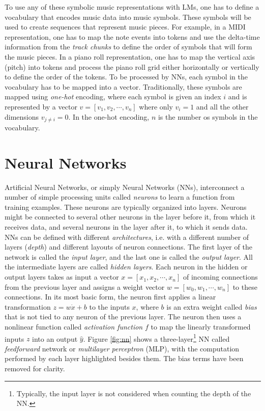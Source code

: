To use any of these symbolic music representations with LMs, one has to define a vocabulary that encodes music data into music symbols. These symbols will be used to create sequences that represent music pieces. For example, in a MIDI representation, one has to map the note events into tokens and use the delta-time information from the \textit{track chunks} to define the order of symbols that will form the music pieces. In a piano roll representation, one has to map the vertical axis (pitch) into tokens and process the piano roll grid either horizontally or vertically to define the order of the tokens. To be processed by NNs, each symbol in the vocabulary has to be mapped into a vector. Traditionally, these symbols are mapped using \textit{one-hot} encoding, where each symbol is given an index $i$ and is represented by a vector $v = [v_1, v_2, \cdots, v_n]$ where only $v_i = 1$ and all the other dimensions $v_{j \neq i} = 0$. In the one-hot encoding, $n$ is the number os symbols in the vocabulary.

\section{Neural Networks}

Artificial Neural Networks, or simply Neural Networks (NNs), interconnect a number of simple processing units called \textit{neurons} to learn a function from training examples. These neurons are typically organized into layers. Neurons might be connected to several other neurons in the layer before it, from which it receives data, and several neurons in the layer after it, to which it sends data. NNs can be defined with different \textit{architectures}, i.e. with a different number of layers (\textit{depth}) and different layouts of neuron connections. The first layer of the network is called the \textit{input layer}, and the last one is called the \textit{output layer}. All the intermediate layers are called \textit{hidden layers}. Each neuron in the hidden or output layers takes as input a vector $x = [x_1, x_2, \cdots, x_n]$ of incoming connections from the previous layer and assigns a weight vector $w = [w_0, w_1, \cdots, w_n]$ to these connections. In its most basic form, the neuron first applies a linear transformation $z = w \dot x + b$ to the inputs $x$, where $b$ is an extra weight called \textit{bias} that is not tied to any neuron of the previous layer. The neuron then uses a nonlinear function called \textit{activation function} $f$ to map the linearly transformed inputs $z$ into an output $\hat{y}$.
Figure \ref{fig:nn} shows a three-layer\footnote{Typically, the input layer is not considered when counting the depth of the NN.} NN called \textit{feedforward} network or \textit{multilayer perceptron} (MLP),
with the computation performed by each layer highlighted besides them. The bias terms have been removed for clarity.

